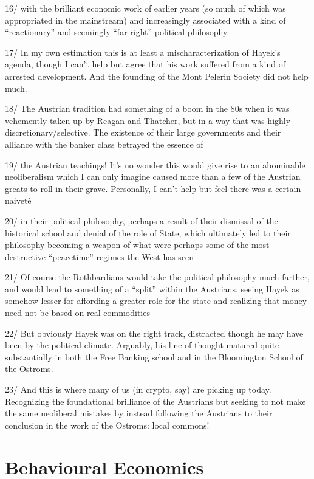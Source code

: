 \documentclass[
]{book}
\begin{document}
16/ with the brilliant economic work of earlier years (so much of which was appropriated in the mainstream) and increasingly associated with a kind of ``reactionary'' and seemingly ``far right'' political philosophy

17/ In my own estimation this is at least a mischaracterization of Hayek's agenda, though I can't help but agree that his work suffered from a kind of arrested development. And the founding of the Mont Pelerin Society did not help much.

18/ The Austrian tradition had something of a boom in the 80s when it was vehemently taken up by Reagan and Thatcher, but in a way that was highly discretionary/selective. The existence of their large governments and their alliance with the banker class betrayed the essence of

19/ the Austrian teachings! It's no wonder this would give rise to an abominable neoliberalism which I can only imagine caused more than a few of the Austrian greats to roll in their grave. Personally, I can't help but feel there was a certain naiveté

20/ in their political philosophy, perhaps a result of their dismissal of the historical school and denial of the role of State, which ultimately led to their philosophy becoming a weapon of what were perhaps some of the most destructive ``peacetime'' regimes the West has seen

21/ Of course the Rothbardians would take the political philosophy much farther, and would lead to something of a ``split'' within the Austrians, seeing Hayek as somehow lesser for affording a greater role for the state and realizing that money need not be based on real commodities

22/ But obviously Hayek was on the right track, distracted though he may have been by the political climate. Arguably, his line of thought matured quite substantially in both the Free Banking school and in the Bloomington School of the Ostroms.

23/ And this is where many of us (in crypto, say) are picking up today. Recognizing the foundational brilliance of the Austrians but seeking to not make the same neoliberal mistakes by instead following the Austrians to their conclusion in the work of the Ostroms: local commons!

\hypertarget{behavioural-economics}{%
\chapter{Behavioural Economics}\label{behavioural-economics}}
\end{document}
